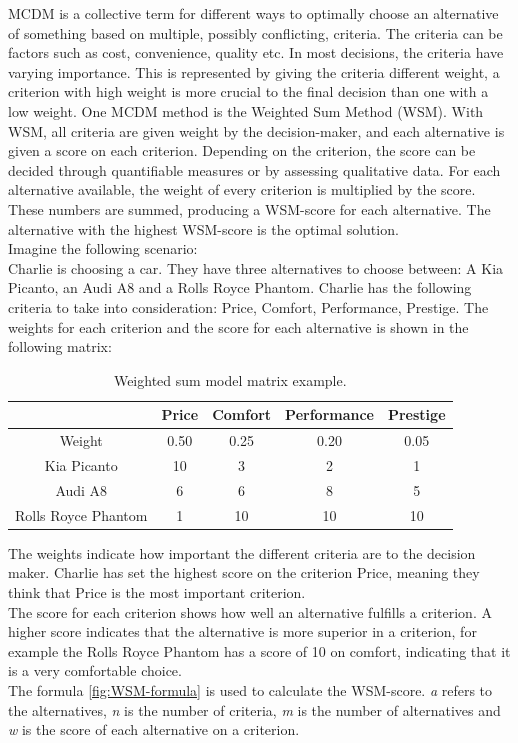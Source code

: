  MCDM is a collective term for different ways to optimally choose an alternative of something based on multiple, possibly conflicting, criteria. 
 The criteria can be factors such as cost, convenience, quality etc. In most decisions, the criteria have varying importance. 
 This is represented by giving the criteria different weight, a criterion with high weight is more crucial to the final decision than one with a low weight. 
One MCDM method is the Weighted Sum Method (WSM). With WSM, all criteria are given weight by the decision-maker, and each alternative is given a score on each criterion. Depending on the criterion, the score can be decided through quantifiable measures or by assessing qualitative data. For each alternative available, the weight of every criterion is multiplied by the score. These numbers are summed, producing a WSM-score for each alternative. The alternative with the highest WSM-score is the optimal solution.\\
Imagine the following scenario:\\
Charlie is choosing a car. They have three alternatives to choose between: A Kia Picanto, an Audi A8 and a Rolls Royce Phantom. 
Charlie has the following criteria to take into consideration: Price, Comfort, Performance, Prestige. The weights for each criterion and the score for each alternative is shown in the following matrix:
\newline

\begin{table}[ht]
    \centering
    \begin{tabular}{ |c|c|c|c|c| } 
        \hline
        \rowcolor{light-gray}
        & Price & Comfort & Performance & Prestige\\
        \hline
        Weight & 0.50 & 0.25 & 0.20 & 0.05 \\ 
        \hline
        Kia Picanto & 10 & 3 & 2 & 1 \\ 
        \hline
        Audi A8 & 6 & 6 & 8 & 5 \\ 
        \hline
        Rolls Royce Phantom & 1 & 10 & 10 & 10 \\
        \hline
    \end{tabular}
    \caption{\label{tab:WSM-Example}Weighted sum model matrix example.}
\end{table}

The weights indicate how important the different criteria are to the decision maker. Charlie has set the highest score on the criterion Price, meaning they think that Price is the most important criterion. \\
The score for each criterion shows how well an alternative fulfills a criterion. A higher score indicates that the alternative is more superior in a criterion, for example the Rolls Royce Phantom has a score of 10 on comfort, indicating that it is a very comfortable choice. \\
The formula \ref{fig:WSM-formula} is used to calculate the WSM-score. \textit{a} refers to the alternatives, \textit{n} is the number of criteria, \textit{m} is the number of alternatives and \textit{w} is the score of each alternative on a criterion.

